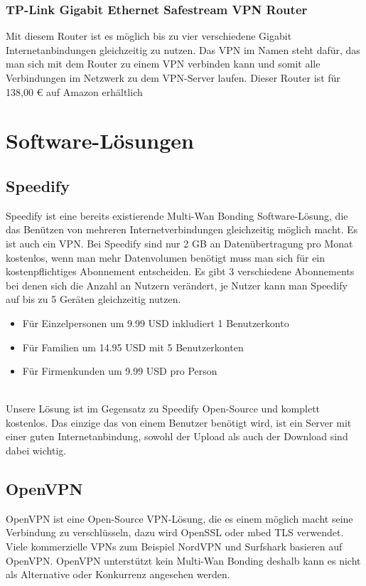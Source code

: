 \subsubsection{TP-Link Gigabit Ethernet Safestream VPN Router}
Mit diesem Router ist es möglich bis zu vier verschiedene Gigabit Internetanbindungen gleichzeitig zu nutzen. Das VPN im Namen steht dafür, das man sich mit dem Router zu einem VPN verbinden kann und somit alle Verbindungen im Netzwerk zu dem VPN-Server laufen. Dieser Router ist für 138,00 € auf Amazon erhältlich

\section{Software-Lösungen}

\subsection{Speedify}
Speedify ist eine bereits existierende Multi-Wan Bonding Software-Lösung, die das Benützen von mehreren Internetverbindungen gleichzeitig möglich macht. Es ist auch ein VPN. Bei Speedify sind nur 2 GB an Datenübertragung pro Monat kostenlos, wenn man mehr Datenvolumen benötigt muss man sich für ein kostenpflichtiges Abonnement entscheiden. Es gibt 3 verschiedene Abonnements bei denen sich die Anzahl an Nutzern verändert, je Nutzer kann man Speedify auf bis zu 5 Geräten gleichzeitig nutzen.
\begin{itemize}
    \item Für Einzelpersonen um 9.99 USD inkludiert 1 Benutzerkonto
    \item Für Familien um 14.95 USD mit 5 Benutzerkonten
    \item Für Firmenkunden um 9.99 USD pro Person
\end{itemize}
\  \\
Unsere Lösung ist im Gegensatz zu Speedify Open-Source und komplett kostenlos. Das einzige das von einem Benutzer benötigt wird, ist ein Server mit einer guten Internetanbindung, sowohl der Upload als auch der Download sind dabei wichtig.

\subsection{OpenVPN}
OpenVPN ist eine Open-Source VPN-Lösung, die es einem möglich macht seine Verbindung zu verschlüsseln, dazu wird OpenSSL oder mbed TLS verwendet. Viele kommerzielle VPNs zum Beispiel NordVPN und Surfshark basieren auf OpenVPN.
\newline
\newline
OpenVPN unterstützt kein Multi-Wan Bonding deshalb kann es nicht als Alternative oder Konkurrenz angesehen werden.
